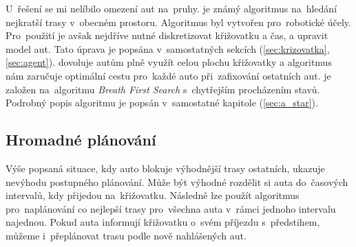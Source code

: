 U~řešení \citet{Dresner} se mi nelíbilo omezení aut na~pruhy.
 je známý algoritmus na~hledání nejkratší trasy v~obecném prostoru.
Algoritmus byl vytvořen \citet*{Hart1968} pro~robotické účely.
Pro~použití  je avšak nejdříve nutné diskretizovat křižovatku a čas, a upravit model aut.
Tato úprava je popsána v~samostatných sekcích (\ref{sec:krizovatka}, \ref{sec:agent}).
 dovoluje autům plně využít celou plochu křižovatky a algoritmus nám zaručuje optimální cestu pro~každé auto při~zafixování ostatních aut.
 je založen na~algoritmu \emph{Breath First Search} s~chytřejším procházením stavů.
Podrobný popis algoritmu je popsán v~samostatné kapitole (\ref{sec:a_star}).

%

\subsection{Hromadné plánování}\label{subsec:hromadne_planovani}


Výše popsaná situace, kdy auto blokuje výhodnější trasy ostatních, ukazuje nevýhodu postupného plánování.
Může být výhodné rozdělit si auta do~časových intervalů, kdy přijedou na~křižovatku.
Následně lze použít algoritmus pro~naplánování co nejlepší trasy pro~všechna auta v~rámci jednoho intervalu najednou.
Pokud auta informují křižovatku o~svém příjezdu s~předstihem, můžeme i~přeplánovat trasu podle nově nahlášených aut.

%
%
%


